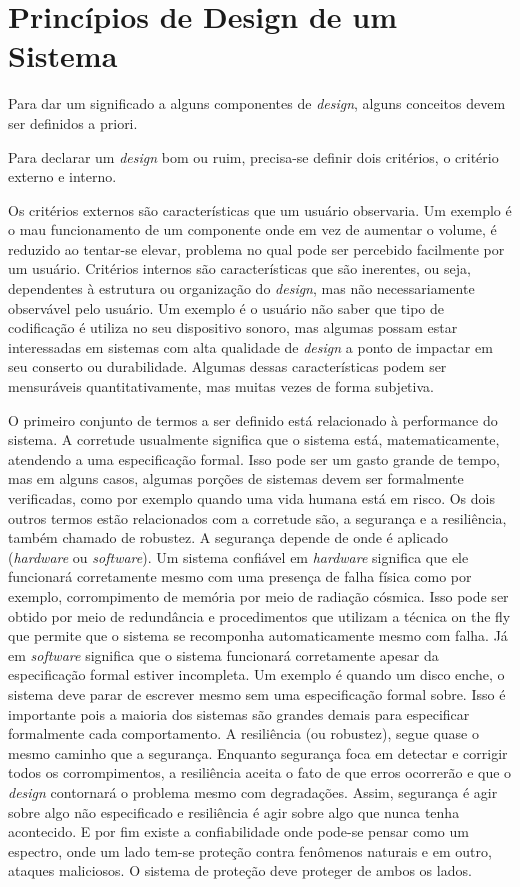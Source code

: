 \section{Princípios de Design de um Sistema}

Para dar um significado a alguns componentes de \textit{design}, alguns conceitos devem ser definidos a priori.

Para declarar um \textit{design} bom ou ruim, precisa-se definir dois critérios, o critério externo e interno.

Os critérios externos são características que um usuário observaria. Um exemplo é o mau funcionamento de um componente onde em vez de aumentar o volume, é reduzido ao tentar-se elevar, problema no qual pode ser percebido facilmente por um usuário. Critérios internos são características que são inerentes, ou seja, dependentes à estrutura ou organização do \textit{design}, mas não necessariamente observável pelo usuário. Um exemplo é o usuário não saber que tipo de codificação é utiliza no seu dispositivo sonoro, mas algumas possam estar interessadas em sistemas com alta qualidade de \textit{design} a ponto de impactar em seu conserto ou durabilidade. Algumas dessas características podem ser mensuráveis quantitativamente, mas muitas vezes de forma subjetiva.

O primeiro conjunto de termos a ser definido está relacionado à performance do sistema. A corretude usualmente significa que o sistema está, matematicamente, atendendo a uma especificação formal. Isso pode ser um gasto grande de tempo, mas em alguns casos, algumas porções de sistemas devem ser formalmente verificadas, como por exemplo quando uma vida humana está em risco. Os dois outros termos estão relacionados com a corretude são, a segurança e a resiliência, também chamado de robustez. A segurança depende de onde é aplicado (\textit{hardware} ou \textit{software}). Um sistema confiável em \textit{hardware} significa que ele funcionará corretamente mesmo com uma presença de falha física como por exemplo, corrompimento de memória por meio de radiação cósmica. Isso pode ser obtido por meio de redundância e procedimentos que utilizam a técnica on the fly que permite que o sistema se recomponha automaticamente mesmo com falha. Já em \textit{software} significa que o sistema funcionará corretamente apesar da especificação formal estiver incompleta. Um exemplo é quando um disco enche, o sistema deve parar de escrever mesmo sem uma especificação formal sobre. Isso é importante pois a maioria dos sistemas são grandes demais para especificar formalmente cada comportamento. A resiliência (ou robustez), segue quase o mesmo caminho que a segurança. Enquanto segurança foca em detectar e corrigir todos os corrompimentos, a resiliência aceita o fato de que erros ocorrerão e que o \textit{design} contornará o problema mesmo com degradações. Assim, segurança é agir sobre algo não especificado e resiliência é agir sobre algo que nunca tenha acontecido. E por fim existe a confiabilidade onde pode-se pensar como um espectro, onde um lado tem-se proteção contra fenômenos naturais e em outro, ataques maliciosos. O sistema de proteção deve proteger de ambos os lados.

